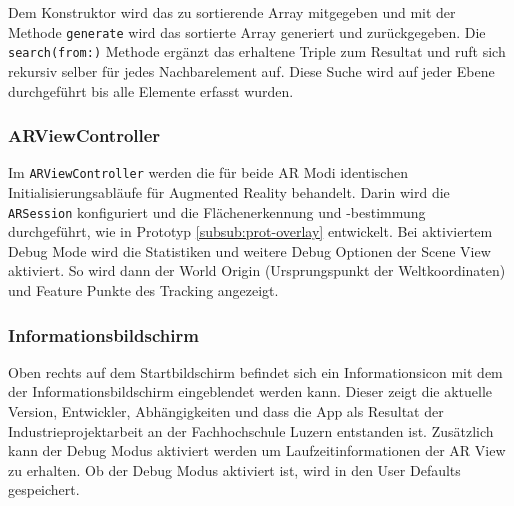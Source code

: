 Dem Konstruktor wird das zu sortierende Array mitgegeben und mit der Methode \texttt{generate} wird das sortierte Array generiert und zurückgegeben.
Die \texttt{search(from:)} Methode ergänzt das erhaltene Triple zum Resultat und ruft sich rekursiv selber für jedes Nachbarelement auf.
Diese Suche wird auf jeder Ebene durchgeführt bis alle Elemente erfasst wurden.

\subsubsection{ARViewController} \label{subsub:umsetzung-arviewcontroller}

Im \texttt{ARViewController} werden die für beide AR Modi identischen Initialisierungsabläufe für Augmented Reality behandelt.
Darin wird die \texttt{ARSession} konfiguriert und die Flächenerkennung und -bestimmung durchgeführt, wie in Prototyp \ref{subsub:prot-overlay} entwickelt.
Bei aktiviertem Debug Mode wird die Statistiken und weitere Debug Optionen der Scene View aktiviert.
So wird dann der World Origin (Ursprungspunkt der Weltkoordinaten) und Feature Punkte des Tracking angezeigt.

\subsubsection{Informationsbildschirm}
Oben rechts auf dem Startbildschirm befindet sich ein Informationsicon mit dem der Informationsbildschirm eingeblendet werden kann. Dieser zeigt die aktuelle Version, Entwickler, Abhängigkeiten und dass die App als Resultat der Industrieprojektarbeit an der Fachhochschule Luzern entstanden ist. Zusätzlich kann der Debug Modus aktiviert werden um Laufzeitinformationen der AR View zu erhalten. Ob der Debug Modus aktiviert ist, wird in den User Defaults gespeichert.
